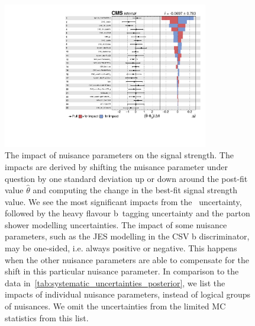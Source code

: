 \begin{figure}
\begin{centering}
\includegraphics[width = 0.8\textwidth]{figures/tth/impacts.pdf}
\caption[The impact of nuisance parameters on the signal strength.]{The impact of nuisance parameters on the signal strength. The impacts are derived by shifting the nuisance parameter under question by one standard deviation up or down around the post-fit value $\hat{\theta}$ and computing the change in the best-fit signal strength value. We see the most significant impacts from the \ttbb~uncertainty, followed by the heavy flavour b~tagging uncertainty and the parton shower modelling uncertainties. The impact of some nuisance parameters, such as the JES modelling in the CSV b discriminator, may be one-sided, i.e. always positive or negative. This happens when the other nuisance parameters are able to compensate for the shift in this particular nuisance parameter. In comparison to the data in~\cref{tab:systematic_uncertainties_posterior}, we list the impacts of individual nuisance parameters, instead of logical groups of nuisances. We omit the uncertainties from the limited MC statistics from this list.}
\label{fig:tth_impacts}
\end{centering}
\end{figure}

